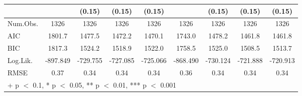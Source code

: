 \begin{table}
\begin{tabular}[t]{lcccccccc}
 &  & (0.15) & (0.15) & (0.15) &  & (0.15) & (0.15) & (0.15)\\
\midrule
Num.Obs. & 1326 & 1326 & 1326 & 1326 & 1326 & 1326 & 1326 & 1326\\
AIC & 1801.7 & 1477.5 & 1472.2 & 1470.1 & 1743.0 & 1478.2 & 1461.8 & 1461.8\\
BIC & 1817.3 & 1524.2 & 1518.9 & 1522.0 & 1758.5 & 1525.0 & 1508.5 & 1513.7\\
Log.Lik. & -897.849 & -729.755 & -727.085 & -725.066 & -868.490 & -730.124 & -721.888 & -720.913\\
RMSE & 0.37 & 0.34 & 0.34 & 0.34 & 0.36 & 0.34 & 0.34 & 0.34\\
\bottomrule
\multicolumn{9}{l}{\rule{0pt}{1em}+ p $<$ 0.1, * p $<$ 0.05, ** p $<$ 0.01, *** p $<$ 0.001}\\
\end{tabular}
\end{table}
